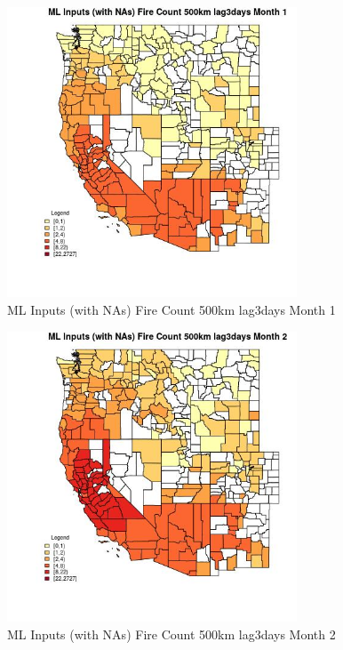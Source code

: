 \clearpage 

\begin{figure} 
\centering  
\includegraphics[width=0.77\textwidth]{Code_Outputs/Report_ML_input_PM25_Step4_part_f_de_duplicated_aveswNAs_CountyFire_Count_500km_lag3daysmedianMonth1.jpg} 
\caption{\label{fig:Report_ML_input_PM25_Step4_part_f_de_duplicated_aveswNAsCountyFire_Count_500km_lag3daysmedianMonth1}ML Inputs (with NAs) Fire Count 500km lag3days Month 1} 
\end{figure} 
 

\begin{figure} 
\centering  
\includegraphics[width=0.77\textwidth]{Code_Outputs/Report_ML_input_PM25_Step4_part_f_de_duplicated_aveswNAs_CountyFire_Count_500km_lag3daysmedianMonth2.jpg} 
\caption{\label{fig:Report_ML_input_PM25_Step4_part_f_de_duplicated_aveswNAsCountyFire_Count_500km_lag3daysmedianMonth2}ML Inputs (with NAs) Fire Count 500km lag3days Month 2} 
\end{figure} 
 

